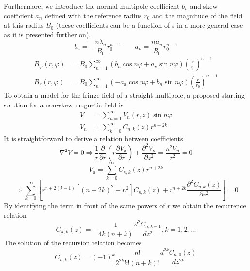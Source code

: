 Furthermore, we introduce the normal multipole coefficient $b_n$ and skew coefficient $a_n$ defined with the reference radius $r_0$ and the magnitude of the field at this radius $B_0$ (these coefficients can be a function of s in a more general case as it is presented further on). 
	\begin{equation}
			b_n = - \frac{n \lambda_n}{B_0} r_0^{n-1} \qquad a_n = \frac{n \mu_n}{B_0} r_0^{n-1}
	\end{equation}
	\begin{align}
		B_{\varphi}(r, \varphi) & = B_0 \sum_{n=1}^{\infty} ( b_n \cos n \varphi+ a_n \sin n \varphi ) \left( \frac{r}{r_0} \right) ^{n-1} \\
		B_r (r, \varphi) & = B_0 \sum_{n=1}^{\infty} ( -a_n \cos n \varphi+ b_n \sin n \varphi ) \left( \frac{r}{r_0} \right) ^{n-1}
	\end{align}	
To obtain a model for the fringe field of a straight multipole, a proposed starting solution for a non-skew magnetic field is 
	\begin{align}
		V & = \sum_{n=1}^{\infty} V_n (r,z) \sin n \varphi \\
		V_n & = \sum_{k=0}^{\infty} C_{n,k}(z) r^{n+2k}
	\end{align}
It is straightforward to derive a relation between coefficients	
	\begin{equation}
		\nabla ^2 V = 0 \Rightarrow \frac{1}{r} \frac{\partial}{\partial r} \left( r \frac{\partial V_n}{\partial r} \right) + \frac{\partial^2 V_n}{\partial z^2} = \frac{n^2 V_n}{r^2} = 0
	\end{equation}
	\begin{equation}
		V_n  = \sum_{k=0}^{\infty} C_{n,k}(z) r^{n+2k}
	\end{equation}
	\begin{equation}
		\Rightarrow  \sum_{k=0}^{\infty} \left[ r^{n+2(k-1)} \left[ (n+2k)^2 - n^2 \right] C_{n,k}(z) + r^{n+2k} \frac{\partial^2 C_{n,k}(z)}{\partial z^2} \right] = 0
	\end{equation}
By identifying the term in front of the same powers of $r$ we obtain the recurrence relation
	\begin{equation}
		C_{n,k}(z) = - \frac{1}{4k(n+k)}   \frac{d^2 C_{n,k-1}} {dz^2}, k = 1,2, \dots
	\end{equation}	 	
The solution of the recursion relation becomes 
	\begin{equation}
		C_{n,k} (z) = (-1)^k \frac{n!}{2^{2k} k! (n+k)!} \frac{d^{2k} C_{n,0}(z)}{dz^{2k}}
	\end{equation}			
